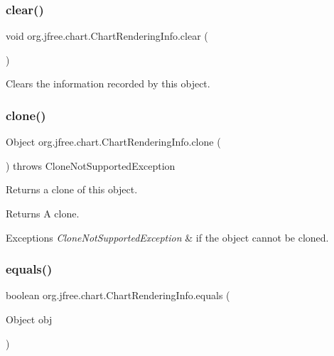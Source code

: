 \subsubsection{\texorpdfstring{clear()}{clear()}}
{\footnotesize\ttfamily void org.\+jfree.\+chart.\+Chart\+Rendering\+Info.\+clear (\begin{DoxyParamCaption}{ }\end{DoxyParamCaption})}

Clears the information recorded by this object. \mbox{\label{classorg_1_1jfree_1_1chart_1_1_chart_rendering_info_a3b2c7bc5c9db5f825fa45541d7eca7e1}} 
\subsubsection{\texorpdfstring{clone()}{clone()}}
{\footnotesize\ttfamily Object org.\+jfree.\+chart.\+Chart\+Rendering\+Info.\+clone (\begin{DoxyParamCaption}{ }\end{DoxyParamCaption}) throws Clone\+Not\+Supported\+Exception}

Returns a clone of this object.

\begin{DoxyReturn}{Returns}
A clone.
\end{DoxyReturn}

\begin{DoxyExceptions}{Exceptions}
{\em Clone\+Not\+Supported\+Exception} & if the object cannot be cloned. \\
\hline
\end{DoxyExceptions}
\mbox{\label{classorg_1_1jfree_1_1chart_1_1_chart_rendering_info_a5578f75ce9a6917b63eb802fb9200555}} 
\subsubsection{\texorpdfstring{equals()}{equals()}}
{\footnotesize\ttfamily boolean org.\+jfree.\+chart.\+Chart\+Rendering\+Info.\+equals (\begin{DoxyParamCaption}\item[{Object}]{obj }\end{DoxyParamCaption})}

